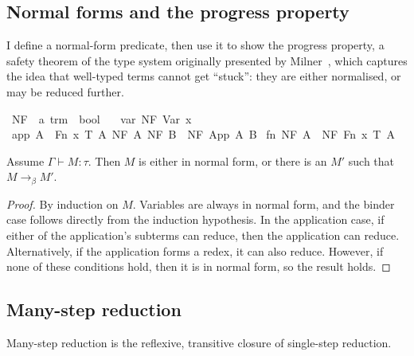 \subsection{Normal forms and the progress property}
I define a normal-form predicate, then use it to show the progress property, a safety theorem of the type system originally presented by Milner~\cite{milner}, which captures the idea that well-typed terms cannot get ``stuck'': they are either normalised, or may be reduced further.

\begin{implementation}
\isamarkupfalse%
\ NF\ {\isacharcolon}{\isacharcolon}\ {\isachardoublequoteopen}{\isacharprime}a\ trm\ {\isasymRightarrow}\ bool{\isachardoublequoteclose}\ \isanewline
\ \ var{\isacharcolon}\ {\isachardoublequoteopen}NF\ {\isacharparenleft}Var\ x{\isacharparenright}{\isachardoublequoteclose}\isanewline
{\isacharbar}\ app{\isacharcolon}\ {\isachardoublequoteopen}{\isasymlbrakk}A\ {\isasymnoteq}\ Fn\ x\ T\ A{\isacharprime}{\isacharsemicolon}\ NF\ A{\isacharsemicolon}\ NF\ B{\isasymrbrakk}\ {\isasymLongrightarrow}\ NF\ {\isacharparenleft}App\ A\ B{\isacharparenright}{\isachardoublequoteclose}\isanewline
{\isacharbar}\ fn{\isacharcolon}\ {\isachardoublequoteopen}NF\ A\ {\isasymLongrightarrow}\ NF\ {\isacharparenleft}Fn\ x\ T\ A{\isacharparenright}{\isachardoublequoteclose}
\end{implementation}

\begin{theorem}
\label{theorem:progress}
Assume \(\Gamma \vdash M : \tau\).
Then \(M\) is either in normal form, or there is an \(M'\) such that \(M \to_\beta M'\).
\end{theorem}
\begin{proof}
By induction on \(M\).
Variables are always in normal form, and the binder case follows directly from the induction hypothesis.
In the application case, if either of the application's subterms can reduce, then the application can reduce.
Alternatively, if the application forms a redex, it can also reduce.
However, if none of these conditions hold, then it is in normal form, so the result holds.
\end{proof}

\subsection{Many-step reduction}
Many-step reduction is the reflexive, transitive closure of single-step reduction.

